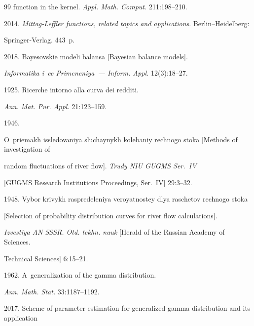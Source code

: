 {{\begin{thebibliography}{99}
  function in the kernel. \textit{Appl. Math. Comput.} 211:198--210.






 2014. \textit{Mittag-Leffler functions, related topics and applications}. Berlin--Heidelberg: 


 Springer-Verlag. 443~p.






 2018. Bayesovskie modeli balansa [Bayesian balance models]. 


 \textit{Informatika i~ee Primeneniya~--- Inform. Appl.} 12(3):18--27.




 1925. Ricerche intorno alla curva dei redditi. 


\textit{Ann. Mat. Pur. Appl.} 21:123--159.




 1946. 


O~priemakh issledovaniya sluchaynykh kolebaniy rechnogo stoka [Methods of investigation of 


random fluctuations of river flow]. \textit{Trudy NIU GUGMS Ser.~IV}


 [GUGMS Research Institutions Proceedings, Ser.~IV] 29:3--32.






 1948. Vybor krivykh raspredeleniya veroyatnostey dlya raschetov rechnogo stoka 


 [Selection of probability distribution curves for river flow calculations]. 


 \textit{Izvestiya AN SSSR. Otd. tekhn. nauk} [Herald of the Russian Academy of Sciences. 


 Technical Sciences] 6:15--21.




 1962. A~generalization of the gamma distribution. 


\textit{Ann. Math. Stat.} 33:1187--1192.






 2017. Scheme of parameter estimation for generalized gamma distribution and its application 



\end{thebibliography}}}
